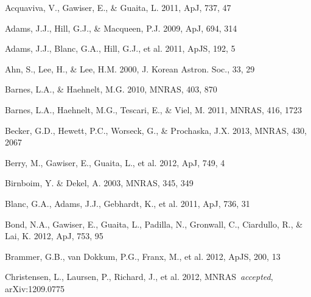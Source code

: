 \documentclass{emulateapj}
\def\apj{ApJ}
\def\apjs{ApJS}
\def\mnras{MNRAS}
\begin{document}
\begin{thebibliography}{}
 Acquaviva, V., Gawiser, E., \& Guaita, L. 2011, \apj, 737, 47

 Adams, J.J., Hill, G.J., \& Macqueen, P.J. 2009, \apj, 694, 314

 Adams, J.J., Blanc, G.A., Hill, G.J., et al. 2011, \apjs, 192, 5

 Ahn, S., Lee, H., \& Lee, H.M. 2000, J. Korean Astron. Soc., 33, 29

 Barnes, L.A., \& Haehnelt, M.G. 2010, \mnras, 403, 870

 Barnes, L.A., Haehnelt, M.G., Tescari, E., \& Viel, M. 2011, \mnras, 416, 1723

 Becker, G.D., Hewett, P.C., Worseck, G., \& Prochaska, J.X. 2013, \mnras, 430, 2067

 Berry, M., Gawiser, E., Guaita, L., et al. 2012, \apj, 749, 4 

 Birnboim, Y. \& Dekel, A. 2003, \mnras, 345, 349

 Blanc, G.A., Adams, J.J., Gebhardt, K., et al. 2011, \apj, 736, 31

 Bond, N.A., Gawiser, E., Guaita, L., Padilla, N., Gronwall, C., Ciardullo, R., \& Lai, K. 2012, \apj, 753, 95

 Brammer, G.B., van Dokkum, P.G., Franx, M., et al. 2012, \apjs, 200, 13

 Christensen, L., Laursen, P., Richard, J., et al. 2012, \mnras\ \textit{accepted}, arXiv:1209.0775


\end{thebibliography}
\end{document}
